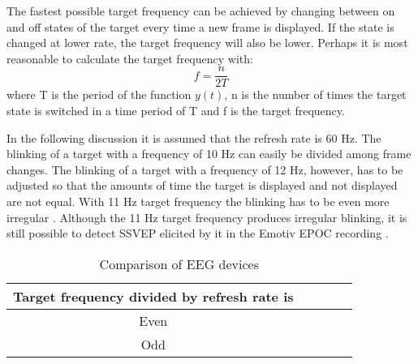 The fastest possible target frequency can be achieved by changing between on and off states of the target every time a new frame is displayed. If the state is changed at lower rate, the target frequency will also be lower. Perhaps it is most reasonable to calculate the target frequency with:
\begin{equation}
	f = \frac{n}{2T}
\end{equation}
where T is the period of the function $y(t)$, n is the number of times the target state is switched in a time period of T and f is the target frequency.

In the following discussion it is assumed that the refresh rate is 60 Hz. The blinking of a target with a frequency of 10 Hz can easily be divided among frame changes. The blinking of a target with a frequency of 12 Hz, however, has to be adjusted so that the amounts of time the target is displayed and not displayed are not equal. With 11 Hz target frequency the blinking has to be even more irregular \cite{11hz}. Although the 11 Hz target frequency produces irregular blinking, it is still possible to detect \gls{SSVEP} elicited by it in the Emotiv EPOC recording \cite{emotiv_11hz}.


\begin{table}[h]
	\centering
	\begin{tabular}{|c|c|c|c|c|}\hline
		Target frequency divided by refresh rate is \\\hline
		Even \\\hline
		Odd \\\hline
	\end{tabular}
	\caption{Comparison of EEG devices}
	\label{tab:square_waves}
\end{table}

